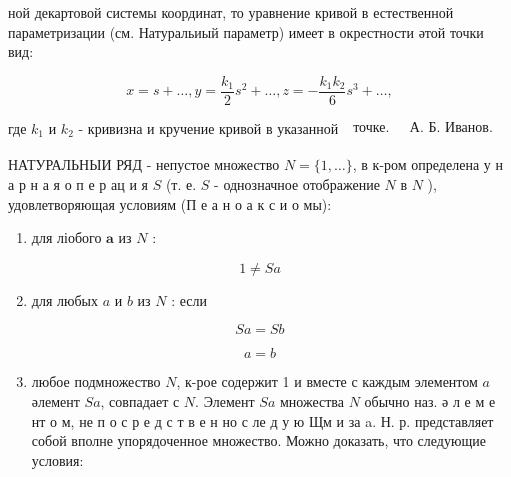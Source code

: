 \documentclass[10pt]{article}
\begin{document}
ной декартовой системы координат, то уравнение кривой в естественной параметризации (см. Натуральиый параметр) имеет в окрестности әтой точки вид:



\[

x=s+\ldots, y=\frac{k_{1}}{2} s^{2}+\ldots, z=-\frac{k_{1} k_{2}}{6} s^{3}+\ldots,

\]



где $k_{1}$ и $k_{2}$ - кривизна и кручение кривой в указанной $\begin{array}{ll}\text { точке. } & \text { А. Б. Иванов. } \\ & \end{array}$



НАТУРАЛЬНЫИ РЯД - непустое множество $N=\{1, \ldots\}$, в к-ром определена у н а р н а я о п е р ац и я $S$ (т. е. $S$ - однозначное отображение $N$ в $N$ ), удовлетворяющая условиям (П е а н о а к с и о мы):



\begin{enumerate}

  \item для ліобого $\boldsymbol{a}$ из $N$ :

\end{enumerate}



\[

1 \neq S a

\]



\begin{enumerate}

  \setcounter{enumi}{1}

  \item для любых $a$ и $b$ из $N$ : если

\end{enumerate}



\[

S a=S b

\]



\[

a=b

\]



\begin{enumerate}

  \setcounter{enumi}{2}

  \item любое подмножество $N$, к-рое содержит 1 и вместе с каждым элементом $a$ әлемент $S a$, совпадает с $N$. Элемент $S a$ множества $N$ обычно наз. ә л е м е нт о м, не п о с р е д с т в е н но с ле д у ю Щм и за a. Н. р. представляет собой вполне упорядоченное множество. Можно доказать, что следующие условия:

\end{enumerate}
\end{document}
